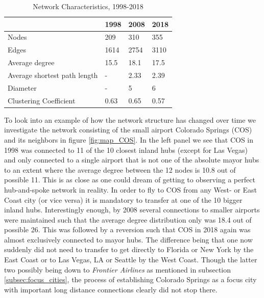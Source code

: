 \begin{table}[H]
\centering 
\caption{Network Characteristics, 1998-2018}
\label{tab: temporal}
\begin{tabular}{|l|l|l|l|}
\hline
\textbf{}                    & \textbf{1998} & \textbf{2008} & \textbf{2018} \\ \hline
Nodes                        & 209           & 310           & 355           \\
Edges                        & 1614          & 2754          & 3110          \\
Average degree               & 15.5         & 18.1         & 17.5          \\
Average shortest path length & -           & 2.33          & 2.39          \\ 
Diameter                     & -             & 5             & 6           \\
Clustering Coefficient       & 0.63          & 0.65          & 0.57          \\ \hline
\end{tabular}
\end{table}
\noindent
To look into an example of how the network structure has changed over time we investigate the network consisting of the small airport Colorado Springs (COS) and its neighbors in figure \ref{fig:map_COS}. In the left panel we see that COS in 1998 was connected to 11 of the 10 closest inland hubs (except for Las Vegas) and only connected to a single airport that is not one of the absolute mayor hubs to an extent where the average degree between the 12 nodes is 10.8 out of possible 11. This is as close as one could dream of getting to observing a perfect hub-and-spoke network in reality. In order to fly to COS from any West- or East Coast city (or vice versa) it is mandatory to transfer at one of the 10 bigger inland hubs. Interestingly enough, by 2008 several connections to smaller airports were maintained such that the average degree distribution only was 18.4 out of possible 26. This was followed by a reversion such that COS in 2018 again was almost exclusively connected to mayor hubs. The difference being that one now suddenly did not need to transfer to get directly to Florida or New York by the East Coast or to Las Vegas, LA or Seattle by the West Coast. Though the latter two possibly being down to \textit{Frontier Airlines} as mentioned in subsection \ref{subsec:focus_cities}, the process of establishing Colorado Springs as a focus city with important long distance connections clearly did not stop there.
